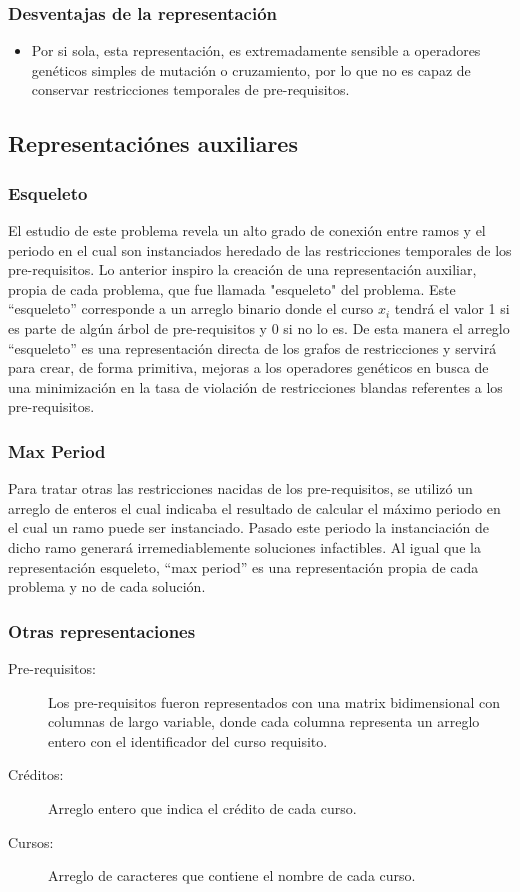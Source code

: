 \documentclass[letter, 10pt]{article}
\begin{document}
\subsubsection{Desventajas de la representación}
\begin{itemize}
	\item Por si sola, esta representación, es extremadamente sensible a
          operadores genéticos simples de mutación o cruzamiento, por lo que no
          es capaz de conservar restricciones temporales de pre-requisitos.
\end{itemize}

\subsection{Representaciónes auxiliares}
\subsubsection{Esqueleto}
El estudio de este problema revela un alto grado de conexión entre ramos y el
periodo en el cual son instanciados heredado de las restricciones temporales de
los pre-requisitos. Lo anterior inspiro la creación de una representación
auxiliar, propia de cada problema, que fue llamada "esqueleto" del problema.
Este ``esqueleto'' corresponde a un arreglo binario donde el curso $x_{i}$ tendrá
el valor 1 si es parte de algún árbol de pre-requisitos y 0 si no lo es. De esta
manera el arreglo ``esqueleto'' es una representación directa de los grafos de
restricciones y servirá para crear, de forma primitiva, mejoras a los operadores
genéticos en busca de una minimización en la tasa de violación de restricciones
blandas referentes a los pre-requisitos.

\subsubsection{Max Period}
Para tratar otras las restricciones nacidas de los pre-requisitos, se utilizó un
arreglo de enteros el cual indicaba el resultado de calcular el máximo periodo
en el cual un ramo puede ser instanciado. Pasado este periodo la instanciación de
dicho ramo generará irremediablemente soluciones infactibles. Al igual que la
representación esqueleto, ``max period'' es una representación propia de cada
problema y no de cada solución.

\subsubsection{Otras representaciones}
\begin{description}
\item[Pre-requisitos:] Los pre-requisitos fueron representados con una matrix
  bidimensional con columnas de largo variable, donde cada columna representa un
  arreglo entero con el identificador del curso requisito.
\item[Créditos:] Arreglo entero que indica el crédito de cada curso.
\item[Cursos:] Arreglo de caracteres que contiene el nombre de cada curso.

\end{description}
\end{document}
